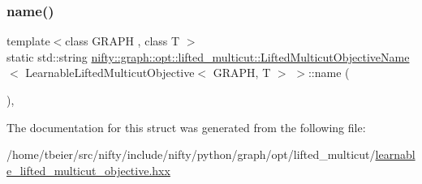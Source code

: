 \subsubsection{\texorpdfstring{name()}{name()}}
{\footnotesize\ttfamily template$<$class G\+R\+A\+PH , class T $>$ \\
static std\+::string \hyperlink{structnifty_1_1graph_1_1opt_1_1lifted__multicut_1_1LiftedMulticutObjectiveName}{nifty\+::graph\+::opt\+::lifted\+\_\+multicut\+::\+Lifted\+Multicut\+Objective\+Name}$<$ Learnable\+Lifted\+Multicut\+Objective$<$ G\+R\+A\+PH, T $>$ $>$\+::name (\begin{DoxyParamCaption}{ }\end{DoxyParamCaption})\hspace{0.3cm}{\ttfamily [inline]}, {\ttfamily [static]}}



The documentation for this struct was generated from the following file\+:\begin{DoxyCompactItemize}
\item 
/home/tbeier/src/nifty/include/nifty/python/graph/opt/lifted\+\_\+multicut/\hyperlink{learnable__lifted__multicut__objective_8hxx}{learnable\+\_\+lifted\+\_\+multicut\+\_\+objective.\+hxx}\end{DoxyCompactItemize}
